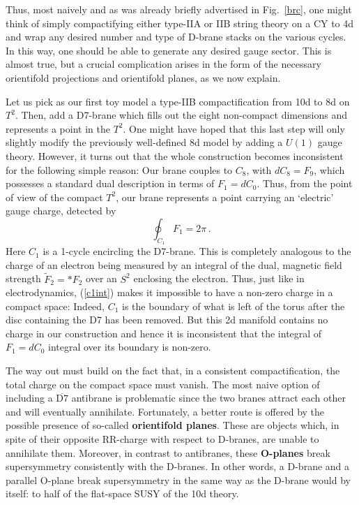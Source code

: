 \documentclass[12pt]{article}
\newcommand{\be}{\begin{equation}}
\newcommand{\ee}{\end{equation}}
\newcommand{\ol}{\overline}
\numberwithin{equation}{section}
\begin{document}
Thus, most naively and as was already briefly advertised in Fig.~\ref{brc}, one might think of simply compactifying either type-IIA or IIB string theory on a CY to 4d and wrap any desired number and type of D-brane stacks on the various cycles. In this way, one should be able to generate any desired gauge sector. This is almost true, but a crucial complication arises in the form of the necessary orientifold projections and orientifold planes, as we now explain.

Let us pick as our first toy model a type-IIB compactification from 10d to 8d on $T^2$. Then, add a D7-brane which fills out the eight non-compact dimensions and represents a point in the $T^2$. One might have hoped that this last step will only slightly modify the previously well-defined 8d model by adding a $U(1)$ gauge theory. However, it turns out that the whole construction becomes inconsistent for the following simple reason: Our brane couples to $C_8$, with $dC_8=F_9$, which possesses a standard dual description in terms of $F_1=dC_0$. Thus, from the point of view of the compact $T^2$, our brane represents a point carrying an `electric' gauge charge, detected by 
\be
\oint_{C_1} F_1 = 2\pi\,.\label{c1int}
\ee
Here $C_1$ is a 1-cycle encircling the D7-brane. This is completely  analogous to the charge of an electron being measured by an integral of the dual, magnetic field strength $\tilde{F}_2=*F_2$ over an $S^2$ enclosing the electron. Thus, just like in electrodynamics, (\ref{c1int}) makes it impossible to have a non-zero charge in a compact space: Indeed, $C_1$ is the boundary of what is left of the torus after the disc containing the D7 has been removed. But this 2d manifold contains no charge in our construction and hence it is inconsistent that the integral of $F_1=dC_0$ integral over its boundary is non-zero.

The way out must build on the fact that, in a consistent compactification, the total charge on the compact space must vanish. The most naive option of including a $\ol{\mbox{D7}}$ antibrane is problematic since the two branes attract each other and will eventually annihilate. Fortunately, a better route is offered by the possible presence of so-called {\bf orientifold planes}. These are objects which, in spite of their opposite RR-charge with respect to D-branes, are unable to annihilate them. Moreover, in contrast to antibranes, these {\bf O-planes} break supersymmetry consistently with the D-branes. In other words, a D-brane and a parallel O-plane break supersymmetry in the same way as the D-brane would by itself: to half of the flat-space SUSY of the 10d theory.
\end{document}
